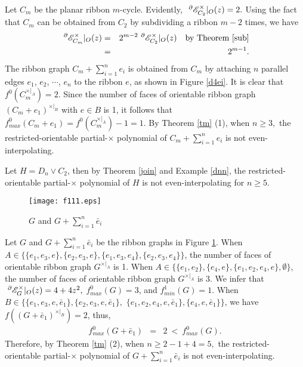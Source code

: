 \begin{example}{
Let $C_m$ be the planar ribbon $m$-cycle. Evidently,
$~^{\partial}{{\mathscr{E}}}^{\times}_{C_2}|_O(z)=2.$
Using the fact that  $C_m$ can be  obtained
from $C_2$ by   subdividing a ribbon   $m-2$ times, we have
\begin{eqnarray*}
~^{\partial}{{\mathscr{E}}}^{\times}_{C_m}|_O(z)  &=&2^{m-2}  ~^{\partial}{{\mathscr{E}}}^{\times}_{C_2}|_O(z)\quad \text{by Theorem \ref{sub}}\notag\\
&=&2^{m-1}.
\end{eqnarray*}
The ribbon graph $C_m+\sum ^{n}_{i=1}e_{i}$ is obtained from $C_m$ by attaching $n$ parallel  edges $e_1$, $e_2$, $\cdots$, $e_n$  to the  ribbon $e$, as shown in Figure \ref{d4ei}. It is clear that $f^{0}(C_m^{\times|_{A}})=2$. Since the number of faces of orientable ribbon graph $(C_m+e_1)^{\times|_{B}}$ with $e\in B$ is 1, it follows that
$f^{0}_{max}(C_m+e_1)=f^{0}(C_m^{\times|_{A}})-1=1$.  By  Theorem \ref{tm} (1), when $n\geq 3,$  the restricted-orientable partial-$\times$ polynomial of $C_m+\sum ^{n}_{i=1}e_{i}$ is not even-interpolating.}

Let $H=D_{n}\vee C_2$,  then by Theorem
  \ref{join}  and  Example \ref{dnn},
the restricted-orientable partial-$\times$ polynomial of  $H$ is not even-interpolating  for $n\geq 5$.







\end{example}







\begin{figure}[h]
  \centering
  \texttt{[image: f111.eps]}
 \caption{$G$ and $G+\sum ^{n}_{i=1}\bar{e}_{i}$ }
 \label{f111}
\end{figure}
\begin{example}
{Let $G$ and $G+\sum ^{n}_{i=1}\bar{e}_{i}$ be the ribbon graphs  in Figure  \ref{f111}. When $A\in \{\{e_{1},e_{3},e\},\{e_{2},e_{3},e\},\{e_{1},e_{3},e_{4}\},\{e_{2},e_{3},e_{4}\}\}$,
the number of faces of orientable ribbon graph $G^{\times|_{A}}$ is 1.
When $A\in \{\{e_{1},e_{2}\},\{e_{4},e\},\{e_{1},e_{2},e_{4},e\},\emptyset\}$,
the number of faces of orientable ribbon graph $G^{\times|_{A}}$ is 3.
We infer that
$~^{\partial}{{\mathscr{E}}}^{\times}_{G}|_O(z)=4+4z^{2},$  $f^{0}_{max}(G)=3$,} and
$f^{1}_{min}(G)=1$.  When $B\in \{\{e_{1},e_{3},e,\bar{e}_{1} \},\{e_{2},e_{3},e, \bar{e}_{1}\},$ $\{e_{1},e_{2},e_{4},e,  \bar{e}_{1}\},\{e_{4},e,  \bar{e}_{1}\}\}$,
we have $f((G+\bar{e}_{1})^{\times|_{B}})=2$, thus,
\begin{eqnarray*}
 f^{0}_{max}(G+\bar{e}_{1})  &=&2 ~<~ f^{0}_{max}(G).
\end{eqnarray*}
 Therefore, by  Theorem \ref{tm} (2),
 when $n \geq2-1+4= 5,$    the restricted-orientable partial-$\times$ polynomial of $G+\sum ^{n}_{i=1}\bar{e}_{i}$ is not even-interpolating.




\end{example}


